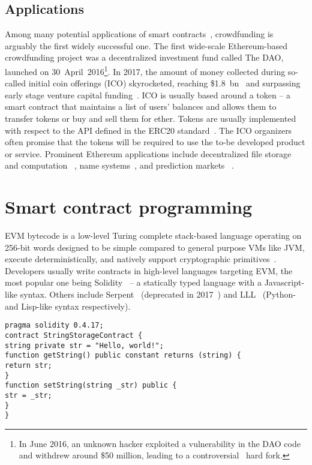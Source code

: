 \subsection{Applications}
Among many potential applications of smart contracts~\cite{McAdams2017}, crowdfunding is arguably the first widely successful one.
The first wide-scale Ethereum-based crowdfunding project was a decentralized investment fund called The DAO, launched on 30~April~2016\footnote{In June 2016, an unknown hacker exploited a vulnerability in the DAO code and withdrew around \$50 million, leading to a controversial~\cite{ETCDeclaration} hard fork.}.
In 2017, the amount of money collected during so-called initial coin offerings (ICO) skyrocketed, reaching \$1.8~bn~\cite{CoindeakICOTracker} and surpassing early stage venture capital funding~\cite{Sunnarborg2017}.
ICO is usually based around a token -- a smart contract that maintains a list of users' balances and allows them to transfer tokens or buy and sell them for ether.
Tokens are usually implemented with respect to the API defined in the ERC20 standard~\cite{Victor2019}.
The ICO organizers often promise that the tokens will be required to use the to-be developed product or service.
Prominent Ethereum applications include decentralized file storage~\cite{Filecoin} \cite{Sia} \cite{Storj} and computation~\cite{Golem} \cite{Sonm}, name systems~\cite{ENS}, and prediction markets~\cite{Augur} \cite{Gnosis}.


\section{Smart contract programming}

EVM bytecode is a low-level Turing complete stack-based language operating on 256-bit words designed to be simple compared to general purpose VMs like JVM, execute deterministically, and natively support cryptographic primitives~\cite{Buterin2017}.
Developers usually write contracts in high-level languages targeting EVM, the most popular one being Solidity~\cite{Solidity17} -- a statically typed language with a Javascript-like syntax.
Others include Serpent~\cite{SerpentGithub} (deprecated in 2017~\cite{Castor2017}) and LLL~\cite{Ellison2017} (Python- and Lisp-like syntax respectively).

\begin{lstlisting}[language=Solidity, caption=A simple contract in Solidity]
pragma solidity 0.4.17;
contract StringStorageContract {
string private str = "Hello, world!";
function getString() public constant returns (string) {
return str;
}
function setString(string _str) public {
str = _str;
}
}
\end{lstlisting}

